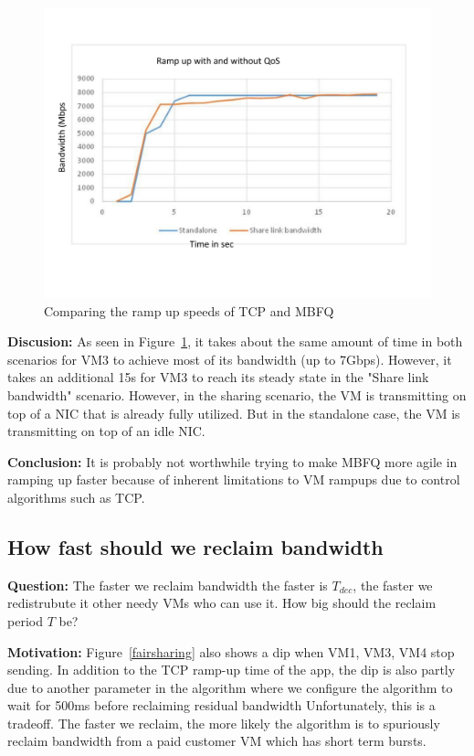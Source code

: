 \begin{figure}[h]
\centering
\includegraphics[width=\columnwidth,trim=60pt 40mm 0pt 8mm]{figures/rampupcomparison}
\caption{Comparing the ramp up speeds of TCP and MBFQ}
\label{rampupcomparison}
\vspace{-3mm}
\end{figure}

{\bf Discusion:} As seen in Figure~\ref{rampupcomparison}, it takes about the
same amount of time in both scenarios for VM3 to achieve most of its bandwidth
(up to 7Gbps). However, it takes an additional 15s for VM3 to reach its steady
state  in the "Share link bandwidth" scenario. However, in the sharing scenario,
the VM is transmitting on top of a NIC that is already fully utilized.
But in the standalone case, the VM is transmitting on top of an idle NIC. 

{\bf Conclusion:} It is probably not worthwhile trying to make MBFQ more agile
in ramping up faster because of inherent limitations to VM rampups due to
control algorithms such as TCP.

\subsection{How fast should we reclaim bandwidth}

{\bf Question:}  The faster we reclaim bandwidth the faster is $T_{dec}$, the
faster we redistrubute it other needy VMs who can use it.  How big should the
reclaim period $T$ be?

{\bf Motivation:} Figure~\ref{fairsharing} also shows a dip when VM1, VM3, VM4
stop sending.  In addition to the TCP ramp-up time of the app, the dip is also
partly due to another parameter in the algorithm where we configure the
algorithm to wait for 500ms before reclaiming residual bandwidth  Unfortunately,
this is a tradeoff.  The faster we reclaim, the more likely the algorithm is to
spuriously reclaim bandwidth from a paid customer VM which has short term
bursts.

